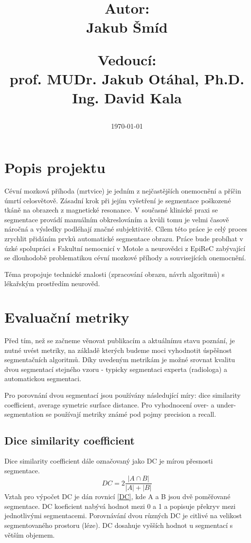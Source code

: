 \documentclass[11pt]{article}
\date{\large \hfill \today}
\title{
	\ifdefined\Subtitle \large \Subtitle \\[1em] \fi
	\LARGE \textbf{\MainTitle} \\[2em]
	\begin{large}
	\begin{minipage}{3cm}
		\textbf{Autor:}\\
		Jakub Šmíd
	\end{minipage}
	\hfill
	\begin{minipage}{6cm}
		\textbf{Vedoucí:}\\
		prof. MUDr. Jakub Otáhal, Ph.D. \\
		Ing. David Kala
	\end{minipage}
	\end{large}
}
\begin{document}
\maketitle

\section{Popis projektu}
Cévní mozková příhoda (mrtvice) je jedním z nejčastějších onemocnění a příčin úmrtí celosvětově. Zásadní krok při jejím vyšetření je segmentace poškozené tkáně na obrazech z magnetické resonance. V současné klinické praxi se segmentace provádí manuálním obkreslováním a kvůli tomu je velmi časově náročná a výsledky podléhají značné subjektivitě. Cílem této práce je celý proces zrychlit přidáním prvků automatické segmentace obrazu.
Práce bude probíhat v úzké spolupráci s Fakultní nemocnicí v Motole a neurovědci z EpiReC zabývající se dlouhodobě problematikou cévní mozkové příhody a souvisejících onemocnění.

Téma propojuje technické znalosti (zpracování obrazu, návrh algoritmů) s lékařským prostředím neurověd.


\section{Evaluační metriky}
Před tím, než se začneme věnovat publikacím a aktuálnímu stavu poznání, je nutné uvést metriky, na základě kterých budeme moci vyhodnotit úspěšnost segmentačních algoritmů. Díky uvedeným metrikám je možné srovnat kvalitu dvou segmentací stejného vzoru - typicky segmentaci experta (radiologa) a automatickou segmentaci.

Pro porovnání dvou segmentací jsou používány následující míry: dice similarity coefficient, average symetric surface distance. Pro vyhodnocení \alert{over- a under-segmentation} se používají metriky známé pod pojmy precision a recall. \cite{Maier2016, Ito2018}
\subsection{Dice similarity coefficient}
Dice similarity coefficient dále označovaný jako DC je mírou přesnosti segmentace.
\begin{equation}
	\label{DC}
	DC = 2 \frac{|A \cap B|}{|A|+|B|}
\end{equation}
Vztah pro výpočet DC je dán rovnicí \ref{DC}, kde A a B jsou dvě poměřované segmentace. DC koeficient nabývá hodnot mezi 0 a 1 a popisuje překryv mezi jednotlivými segmentacemi. Porovnávání dvou různých DC je citlivé na velikost segmentovaného prostoru (léze). DC dosahuje vyšších hodnot u segmentací s větším objemem.
\end{document}
